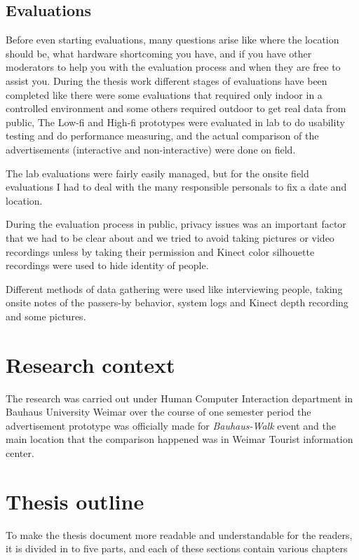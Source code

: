 \subsection{Evaluations}
Before even starting evaluations, many questions arise like where the location should be, what hardware shortcoming you have, and if you have other moderators to help you with the evaluation process and when they are free to assist you. During the thesis work different stages of evaluations have been completed like there were some evaluations that required only indoor in a controlled environment and some others required outdoor to get real data from public, The Low-fi and High-fi prototypes were evaluated in lab to do usability testing and do performance measuring, and the actual comparison of the advertisements (interactive and non-interactive) were done on field. 

The lab evaluations were fairly easily managed, but for the onsite field evaluations I had to deal with the many responsible personals to fix a date and location.

During the evaluation process in public, privacy issues was an important factor that we had to be clear about and we tried to avoid taking pictures or video recordings unless by taking their permission and Kinect color silhouette recordings were used to hide identity of people.

Different methods of data gathering were used like interviewing people, taking onsite notes of the passers-by behavior, system logs and Kinect depth recording and some pictures. 


\section{Research context}
The research was carried out under Human Computer Interaction department in Bauhaus University Weimar over the course of one semester period the advertisement prototype was officially made for \emph{Bauhaus-Walk} event and the main location that the comparison happened was in Weimar Tourist information center.

\newpage
\section{Thesis outline}
To make the thesis document more readable and understandable for the readers, it is divided in to five parts, and each of these sections contain various chapters


